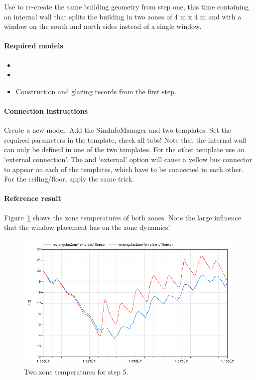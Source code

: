 \documentclass[10pt,a4paper]{article}
\begin{document}
Use  to re-create the same building geometry from
step one, this time containing an internal wall that splits the building in two
zones of 4 m x 4 m and with a window on the south and north sides instead of a single window.


\paragraph{Required models}
\begin{itemize}
\item {}
\item {}
\item Construction and glazing records from the first step.
\end{itemize}

\paragraph{Connection instructions}
Create a new model. Add the SimInfoManager and two templates.
Set the required parameters in the template, check all tabs! 
Note that the internal wall can only be defined in one of the two templates.
For the other template use an `external connection'. 
The  and `external' option will cause a 
yellow bus connector to appear on each of the templates,
which have to be connected to each other.
For the ceiling/floor, apply the same trick.


\paragraph{Reference result}
Figure~\ref{fig:res5} shows the zone temperatures of both zones.
Note the large influence that the window placement has on the zone dynamics!



\begin{figure}
\centering
\includegraphics[scale=0.7]{Example5.png}
\caption{Two zone temperatures for step 5.}
\label{fig:res5}
\end{figure}
\end{document}
